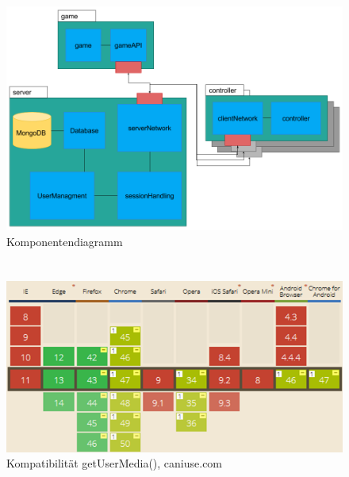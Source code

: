 \documentclass[a4paper]{spie}  %
\begin{document}
\begin{appendices}
\section{}
\begin{figure}[H]
	\centering
	\includegraphics[width=1\textwidth]{images/komponenten}
	\caption{Komponentendiagramm}
	\label{komponenten}
\end{figure}
  \section{}

	\begin{figure}[H]
		\includegraphics{images/caniuseGetUserMedia}
		\caption{Kompatibilität getUserMedia(), caniuse.com}
		\label{app:caniuseMedia}
	\end{figure}



\end{appendices}
\end{document}
